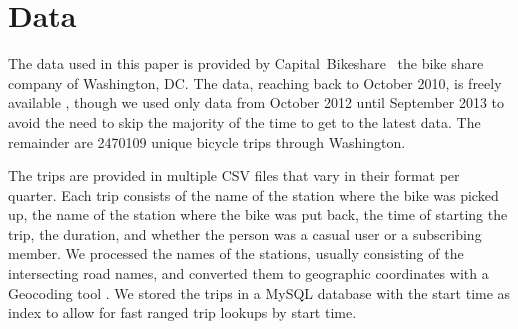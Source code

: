 \section{Data}
\label{sec:data}
The data used in this paper is provided by Capital~Bikeshare~\cite{wash}
the bike share company of Washington, DC. The data, reaching back
to October 2010, is freely available \cite{data}, though we used
only data from October 2012 until September 2013 to avoid the need
to skip the majority of the time to get to the latest data.
The remainder are 2470109 unique bicycle trips through Washington.

The trips are provided in multiple CSV files that vary in their format
per quarter.
Each trip consists of the name of the station where the bike was
picked up, the name of the station where the bike was put back, the time of
starting the trip, the duration, and whether the person was a
casual user or a subscribing member.
We processed the names of the stations,
usually consisting of the intersecting road names,
and converted them to geographic coordinates with a Geocoding
tool \cite{convert}.
We stored the trips in a MySQL database with the start time
as index to allow for fast ranged trip lookups by start time.
